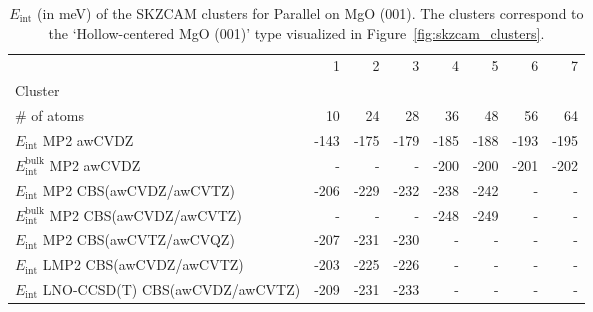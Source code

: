 \begin{table}
\caption{\label{tab:system_eint_mgo_n2o_parallel}$E_\textrm{int}$ (in meV) of the SKZCAM clusters for Parallel  on MgO (001). The clusters correspond to the `Hollow-centered MgO (001)' type visualized in Figure~\ref{fig:skzcam_clusters}.}
\begin{adjustbox}{center,max width=1.4\textwidth}
\begin{tabular}{lrrrrrrr}
\toprule
 & 1 & 2 & 3 & 4 & 5 & 6 & 7 \\ 
Cluster &  &  &  &  &  &  &  \\
\midrule
\# of atoms & 10 & 24 & 28 & 36 & 48 & 56 & 64 \\
$E_\textrm{int}$ MP2 awCVDZ & -143 & -175 & -179 & -185 & -188 & -193 & -195 \\
$E_\textrm{int}^\textrm{bulk}$ MP2 awCVDZ & - & - & - & -200 & -200 & -201 & -202 \\
$E_\textrm{int}$ MP2 CBS(awCVDZ/awCVTZ) & -206 & -229 & -232 & -238 & -242 & - & - \\
$E_\textrm{int}^\textrm{bulk}$ MP2 CBS(awCVDZ/awCVTZ) & - & - & - & -248 & -249 & - & - \\
$E_\textrm{int}$ MP2 CBS(awCVTZ/awCVQZ) & -207 & -231 & -230 & - & - & - & - \\
$E_\textrm{int}$ LMP2 CBS(awCVDZ/awCVTZ) & -203 & -225 & -226 & - & - & - & - \\
$E_\textrm{int}$ LNO-CCSD(T) CBS(awCVDZ/awCVTZ) & -209 & -231 & -233 & - & - & - & - \\
\bottomrule
\end{tabular}
\end{adjustbox}
\end{table}

